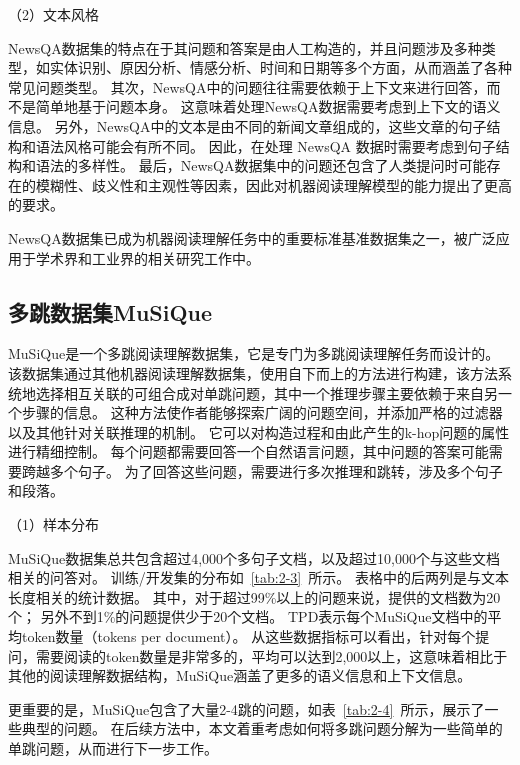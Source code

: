 

（2）文本风格

NewsQA数据集的特点在于其问题和答案是由人工构造的，并且问题涉及多种类型，如实体识别、原因分析、情感分析、时间和日期等多个方面，从而涵盖了各种常见问题类型。
其次，NewsQA中的问题往往需要依赖于上下文来进行回答，而不是简单地基于问题本身。
这意味着处理NewsQA数据需要考虑到上下文的语义信息。
另外，NewsQA中的文本是由不同的新闻文章组成的，这些文章的句子结构和语法风格可能会有所不同。
因此，在处理 NewsQA 数据时需要考虑到句子结构和语法的多样性。
最后，NewsQA数据集中的问题还包含了人类提问时可能存在的模糊性、歧义性和主观性等因素，因此对机器阅读理解模型的能力提出了更高的要求。

NewsQA数据集已成为机器阅读理解任务中的重要标准基准数据集之一，被广泛应用于学术界和工业界的相关研究工作中。

\subsection{多跳数据集MuSiQue}
MuSiQue是一个多跳阅读理解数据集，它是专门为多跳阅读理解任务而设计的。
该数据集通过其他机器阅读理解数据集，使用自下而上的方法进行构建，该方法系统地选择相互关联的可组合成对单跳问题，其中一个推理步骤主要依赖于来自另一个步骤的信息。
这种方法使作者能够探索广阔的问题空间，并添加严格的过滤器以及其他针对关联推理的机制。
它可以对构造过程和由此产生的k-hop问题的属性进行精细控制。
每个问题都需要回答一个自然语言问题，其中问题的答案可能需要跨越多个句子。
为了回答这些问题，需要进行多次推理和跳转，涉及多个句子和段落。


（1）样本分布

MuSiQue数据集总共包含超过4,000个多句子文档，以及超过10,000个与这些文档相关的问答对。
训练/开发集的分布如~\ref{tab:2-3}~所示。
表格中的后两列是与文本长度相关的统计数据。
其中，对于超过99\%以上的问题来说，提供的文档数为20个；
另外不到1\%的问题提供少于20个文档。
TPD表示每个MuSiQue文档中的平均token数量（tokens per document）。
从这些数据指标可以看出，针对每个提问，需要阅读的token数量是非常多的，平均可以达到2,000以上，这意味着相比于其他的阅读理解数据结构，MuSiQue涵盖了更多的语义信息和上下文信息。



更重要的是，MuSiQue包含了大量2-4跳的问题，如表~\ref{tab:2-4}~所示，展示了一些典型的问题。
在后续方法中，本文着重考虑如何将多跳问题分解为一些简单的单跳问题，从而进行下一步工作。



